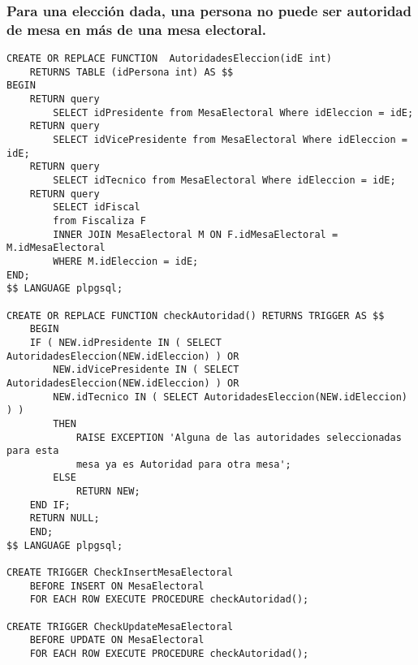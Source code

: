 \subsubsection{Para una elección dada, una persona no puede ser autoridad de mesa en más de una mesa electoral.}
\begin{verbatim}
CREATE OR REPLACE FUNCTION  AutoridadesEleccion(idE int) 
    RETURNS TABLE (idPersona int) AS $$
BEGIN
    RETURN query 
        SELECT idPresidente from MesaElectoral Where idEleccion = idE;
    RETURN query 
        SELECT idVicePresidente from MesaElectoral Where idEleccion = idE;
    RETURN query 
        SELECT idTecnico from MesaElectoral Where idEleccion = idE;
    RETURN query 
        SELECT idFiscal 
        from Fiscaliza F 
        INNER JOIN MesaElectoral M ON F.idMesaElectoral = M.idMesaElectoral 
        WHERE M.idEleccion = idE;
END;
$$ LANGUAGE plpgsql;

CREATE OR REPLACE FUNCTION checkAutoridad() RETURNS TRIGGER AS $$
    BEGIN
    IF ( NEW.idPresidente IN ( SELECT AutoridadesEleccion(NEW.idEleccion) ) OR
        NEW.idVicePresidente IN ( SELECT AutoridadesEleccion(NEW.idEleccion) ) OR
        NEW.idTecnico IN ( SELECT AutoridadesEleccion(NEW.idEleccion) ) )
        THEN
            RAISE EXCEPTION 'Alguna de las autoridades seleccionadas para esta 
            mesa ya es Autoridad para otra mesa';
        ELSE
            RETURN NEW;
    END IF;
    RETURN NULL;
    END;
$$ LANGUAGE plpgsql;

CREATE TRIGGER CheckInsertMesaElectoral
    BEFORE INSERT ON MesaElectoral
    FOR EACH ROW EXECUTE PROCEDURE checkAutoridad();

CREATE TRIGGER CheckUpdateMesaElectoral
    BEFORE UPDATE ON MesaElectoral
    FOR EACH ROW EXECUTE PROCEDURE checkAutoridad();

\end{verbatim}

